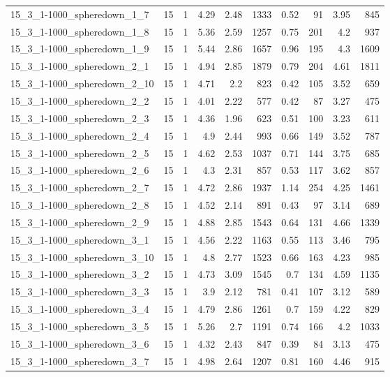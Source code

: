 \begin{center}
\begin{scriptsize}
\begin{longtable}{lrrrrrrrrr}
15\_3\_1-1000\_spheredown\_1\_7 & 15 & 1 & 4.29 & 2.48 & 1333 & 0.52 & 91 & 3.95 & 845\\
15\_3\_1-1000\_spheredown\_1\_8 & 15 & 1 & 5.36 & 2.59 & 1257 & 0.75 & 201 & 4.2 & 937\\
15\_3\_1-1000\_spheredown\_1\_9 & 15 & 1 & 5.44 & 2.86 & 1657 & 0.96 & 195 & 4.3 & 1609\\
15\_3\_1-1000\_spheredown\_2\_1 & 15 & 1 & 4.94 & 2.85 & 1879 & 0.79 & 204 & 4.61 & 1811\\
15\_3\_1-1000\_spheredown\_2\_10 & 15 & 1 & 4.71 & 2.2 & 823 & 0.42 & 105 & 3.52 & 659\\
15\_3\_1-1000\_spheredown\_2\_2 & 15 & 1 & 4.01 & 2.22 & 577 & 0.42 & 87 & 3.27 & 475\\
15\_3\_1-1000\_spheredown\_2\_3 & 15 & 1 & 4.36 & 1.96 & 623 & 0.51 & 100 & 3.23 & 611\\
15\_3\_1-1000\_spheredown\_2\_4 & 15 & 1 & 4.9 & 2.44 & 993 & 0.66 & 149 & 3.52 & 787\\
15\_3\_1-1000\_spheredown\_2\_5 & 15 & 1 & 4.62 & 2.53 & 1037 & 0.71 & 144 & 3.75 & 685\\
15\_3\_1-1000\_spheredown\_2\_6 & 15 & 1 & 4.3 & 2.31 & 857 & 0.53 & 117 & 3.62 & 857\\
15\_3\_1-1000\_spheredown\_2\_7 & 15 & 1 & 4.72 & 2.86 & 1937 & 1.14 & 254 & 4.25 & 1461\\
15\_3\_1-1000\_spheredown\_2\_8 & 15 & 1 & 4.52 & 2.14 & 891 & 0.43 & 97 & 3.14 & 689\\
15\_3\_1-1000\_spheredown\_2\_9 & 15 & 1 & 4.88 & 2.85 & 1543 & 0.64 & 131 & 4.66 & 1339\\
15\_3\_1-1000\_spheredown\_3\_1 & 15 & 1 & 4.56 & 2.22 & 1163 & 0.55 & 113 & 3.46 & 795\\
15\_3\_1-1000\_spheredown\_3\_10 & 15 & 1 & 4.8 & 2.77 & 1523 & 0.66 & 163 & 4.23 & 985\\
15\_3\_1-1000\_spheredown\_3\_2 & 15 & 1 & 4.73 & 3.09 & 1545 & 0.7 & 134 & 4.59 & 1135\\
15\_3\_1-1000\_spheredown\_3\_3 & 15 & 1 & 3.9 & 2.12 & 781 & 0.41 & 107 & 3.12 & 589\\
15\_3\_1-1000\_spheredown\_3\_4 & 15 & 1 & 4.79 & 2.86 & 1261 & 0.7 & 159 & 4.22 & 829\\
15\_3\_1-1000\_spheredown\_3\_5 & 15 & 1 & 5.26 & 2.7 & 1191 & 0.74 & 166 & 4.2 & 1033\\
15\_3\_1-1000\_spheredown\_3\_6 & 15 & 1 & 4.32 & 2.43 & 847 & 0.39 & 84 & 3.13 & 475\\
15\_3\_1-1000\_spheredown\_3\_7 & 15 & 1 & 4.98 & 2.64 & 1207 & 0.81 & 160 & 4.46 & 915\\

\end{longtable}
\end{scriptsize}
\end{center}
